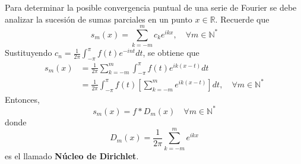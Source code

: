 \documentclass[12pt]{report}
\newcounter{it}
\theoremstyle{largebreak}
\begin{document}
    Para determinar la posible convergencia puntual de una serie de Fourier se debe analizar la sucesión de sumas parciales en un punto $x\in\mathbb{R}$. Recuerde que 
    \begin{equation*}
        s_m(x)=\sum_{ k=-m}^m c_ke^{ ikx},\quad\forall m\in\mathbb{N}^*
    \end{equation*}
    Sustituyendo $c_n=\frac{1}{2\pi}\int_{-\pi}^\pi f(t)e^{ -int}dt$, se obtiene que
    \begin{equation*}
        \begin{split}
            s_m(x)&=\frac{1}{2\pi}\sum_{ k=-m}^m\int_{-\pi}^\pi f(t)e^{ ik(x-t)}dt\\
            &=\frac{1}{2\pi}\int_{-\pi}^\pi f(t)\left[\sum_{ k=-m}^m e^{ ik(x-t)}\right]dt ,\quad\forall m\in\mathbb{N}^*
        \end{split}
    \end{equation*}
    Entonces,
    \begin{equation*}
        s_m(x)=f*D_m(x)\quad\forall m\in\mathbb{N}^*
    \end{equation*}
    donde
    \begin{equation*}
        D_m(x)=\frac{1}{2\pi}\sum_{ k=-m}^m e^{ ikx}
    \end{equation*}
    es el llamado \textbf{Núcleo de Dirichlet}.
\end{document}
